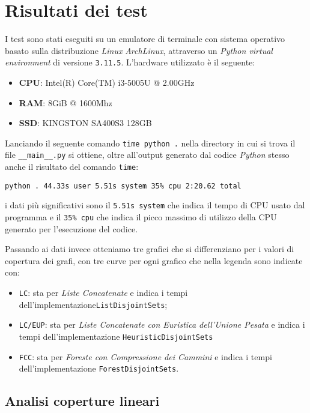 \section{Risultati dei test}

I test sono stati eseguiti su un emulatore di terminale con sistema operativo basato sulla distribuzione \textit{Linux} \textit{ArchLinux},
attraverso un \textit{Python virtual environment} di versione \texttt{3.11.5}. L'hardware utilizzato è il seguente:
\begin{itemize}
    \item \textbf{CPU}: Intel(R) Core(TM) i3-5005U @ 2.00GHz
    \item \textbf{RAM}: 8GiB @ 1600Mhz
    \item \textbf{SSD}: KINGSTON SA400S3 128GB
\end{itemize}

Lanciando il seguente comando \texttt{time python .} nella directory in cui si trova il file \texttt{\_\_main\_\_.py} si ottiene,
oltre all'output generato dal codice \textit{Python} stesso anche il risultato del comando \texttt{time}:
\begin{center}
    \texttt{python .  44.33s user 5.51s system 35\% cpu 2:20.62 total}
\end{center}
i dati più significativi sono il \texttt{5.51s system} che indica il tempo di CPU usato dal programma e il \texttt{35\% cpu} che indica
il picco massimo di utilizzo della CPU generato per l'esecuzione del codice.\newline

Passando ai dati invece otteniamo tre grafici che si differenziano per i valori di copertura dei grafi, con tre curve
per ogni grafico che nella legenda sono indicate con:
\begin{itemize}
    \item \texttt{LC}: sta per \textit{Liste Concatenate} e indica i tempi dell'implementazione\linebreak \texttt{ListDisjointSets};
    \item \texttt{LC/EUP}: sta per \textit{Liste Concatenate con Euristica dell'Unione Pesata} e indica i tempi dell'implementazione
          \texttt{HeuristicDisjointSets}
    \item \texttt{FCC}: sta per \textit{Foreste con Compressione dei Cammini} e indica i tempi dell'implementazione \texttt{ForestDisjointSets}.
\end{itemize}

\subsection{Analisi coperture lineari}

